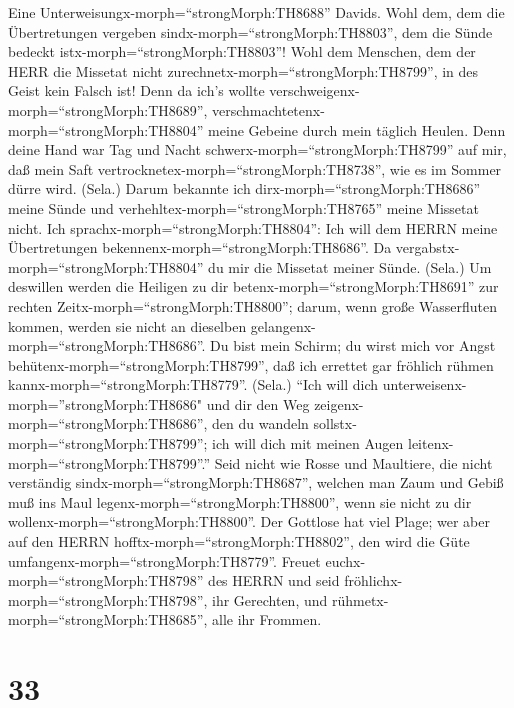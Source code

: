  Eine Unterweisungx-morph=``strongMorph:TH8688'' Davids.
Wohl dem, dem die Übertretungen vergeben
sindx-morph=``strongMorph:TH8803'', dem die Sünde bedeckt
istx-morph=``strongMorph:TH8803''!  Wohl dem Menschen, dem
der HERR die Missetat nicht zurechnetx-morph=``strongMorph:TH8799'', in
des Geist kein Falsch ist!  Denn da ich's wollte
verschweigenx-morph=``strongMorph:TH8689'',
verschmachtetenx-morph=``strongMorph:TH8804'' meine Gebeine durch mein
täglich Heulen.  Denn deine Hand war Tag und Nacht
schwerx-morph=``strongMorph:TH8799'' auf mir, daß mein Saft
vertrocknetex-morph=``strongMorph:TH8738'', wie es im Sommer dürre wird.
(Sela.)  Darum bekannte ich
dirx-morph=``strongMorph:TH8686'' meine Sünde und
verhehltex-morph=``strongMorph:TH8765'' meine Missetat nicht. Ich
sprachx-morph=``strongMorph:TH8804'': Ich will dem HERRN meine
Übertretungen bekennenx-morph=``strongMorph:TH8686''. Da
vergabstx-morph=``strongMorph:TH8804'' du mir die Missetat meiner Sünde.
(Sela.)  Um deswillen werden die Heiligen zu dir
betenx-morph=``strongMorph:TH8691'' zur rechten
Zeitx-morph=``strongMorph:TH8800''; darum, wenn große Wasserfluten
kommen, werden sie nicht an dieselben
gelangenx-morph=``strongMorph:TH8686''.  Du bist mein
Schirm; du wirst mich vor Angst behütenx-morph=``strongMorph:TH8799'',
daß ich errettet gar fröhlich rühmen kannx-morph=``strongMorph:TH8779''.
(Sela.)  ``Ich will dich
unterweisenx-morph=''strongMorph:TH8686" und dir den Weg
zeigenx-morph=``strongMorph:TH8686'', den du wandeln
sollstx-morph=``strongMorph:TH8799''; ich will dich mit meinen Augen
leitenx-morph=``strongMorph:TH8799''.''  Seid nicht wie
Rosse und Maultiere, die nicht verständig
sindx-morph=``strongMorph:TH8687'', welchen man Zaum und Gebiß muß ins
Maul legenx-morph=``strongMorph:TH8800'', wenn sie nicht zu dir
wollenx-morph=``strongMorph:TH8800''.  Der Gottlose hat
viel Plage; wer aber auf den HERRN hofftx-morph=``strongMorph:TH8802'',
den wird die Güte umfangenx-morph=``strongMorph:TH8779''. 
Freuet euchx-morph=``strongMorph:TH8798'' des HERRN und seid
fröhlichx-morph=``strongMorph:TH8798'', ihr Gerechten, und
rühmetx-morph=``strongMorph:TH8685'', alle ihr Frommen.

\hypertarget{section-32}{%
\section{33}\label{section-32}}

